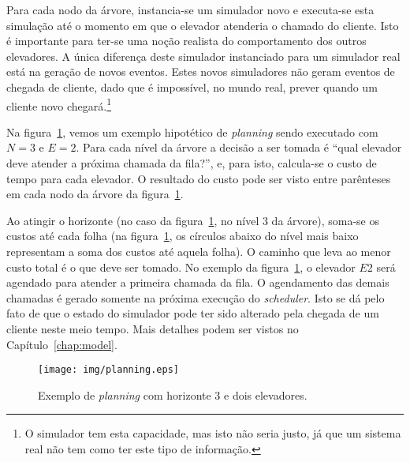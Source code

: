 Para cada nodo da árvore, instancia-se um simulador novo e executa-se esta
simulação até o momento em que o elevador atenderia o chamado do cliente. Isto é
importante para ter-se uma noção realista do comportamento dos outros
elevadores. A única diferença deste simulador instanciado para um simulador real
está na geração de novos eventos. Estes novos simuladores não geram eventos de
chegada de cliente, dado que é impossível, no mundo real, prever quando um
cliente novo chegará.\footnote{O simulador tem esta capacidade, mas isto não
  seria justo, já que um sistema real não tem como ter este tipo de informação.}

Na figura~\ref{fig:planning}, vemos um exemplo hipotético de \textit{planning}
sendo executado com $N = 3$ e $E = 2$. Para cada nível da árvore a decisão a ser
tomada é ``qual elevador deve atender a próxima chamada da fila?'', e, para
isto, calcula-se o custo de tempo para cada elevador. O resultado do custo
pode ser visto entre parênteses em cada nodo da árvore da
figura~\ref{fig:planning}.

Ao atingir o horizonte (no caso da figura~\ref{fig:planning}, no nível 3 da
árvore), soma-se os custos até cada folha (na figura~\ref{fig:planning}, os
círculos abaixo do nível mais baixo representam a soma dos custos até aquela
folha). O caminho que leva ao menor custo total é o que deve ser tomado. No
exemplo da figura~\ref{fig:planning}, o elevador $E2$ será agendado para atender
a primeira chamada da fila. O agendamento das demais chamadas é gerado somente
na próxima execução do \textit{scheduler}. Isto se dá pelo fato de que o estado
do simulador pode ter sido alterado pela chegada de um cliente neste meio tempo.
Mais detalhes podem ser vistos no Capítulo~\ref{chap:model}.

\begin{figure}[htb!]
  \centering
  \texttt{[image: img/planning.eps]}
  \caption{Exemplo de \textit{planning} com horizonte 3 e dois elevadores.}
\label{fig:planning}
\end{figure}